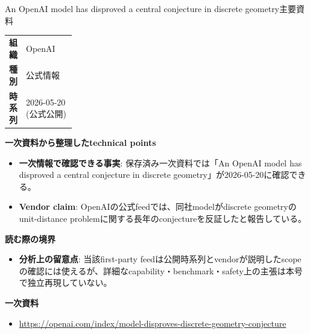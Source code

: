 \begin{technicalnote}{An OpenAI model has disproved a central conjecture in discrete geometry}{主要資料}
\begingroup
\begin{tabularx}{\linewidth}{@{}>{\bfseries}p{0.22\linewidth}X@{}}
組織 & OpenAI \\
種別 & 公式情報 \\
時系列 & 2026-05-20 (公式公開) \\
\end{tabularx}
\smallskip
{\bfseries 一次資料から整理したtechnical points}
\begin{itemize}[leftmargin=1.5em,itemsep=0.35em]
\item \textbf{一次情報で確認できる事実}: 保存済み一次資料では「An OpenAI model has disproved a central conjecture in discrete geometry」が2026-05-20に確認できる。
\end{itemize}
\begin{minipage}{\linewidth}
\begin{itemize}[leftmargin=1.5em,itemsep=0.35em]
\item \textbf{Vendor claim}: OpenAIの公式feedでは、同社modelがdiscrete geometryのunit-distance problemに関する長年のconjectureを反証したと報告している。
\end{itemize}
{\bfseries 読む際の境界}
\begin{itemize}[leftmargin=1.5em,itemsep=0.35em]
\item \textbf{分析上の留意点}: 当該first-party feedは公開時系列とvendorが説明したscopeの確認には使えるが、詳細なcapability・benchmark・safety上の主張は本号で独立再現していない。
\end{itemize}
\begin{samepage}
{\bfseries 一次資料}
\begingroup\sloppy
\begin{itemize}[leftmargin=1.5em,itemsep=0.25em]
\item {\scriptsize\url{https://openai.com/index/model-disproves-discrete-geometry-conjecture}}
\end{itemize}
\endgroup
\end{samepage}
\end{minipage}
\endgroup
\end{technicalnote}
\medskip

